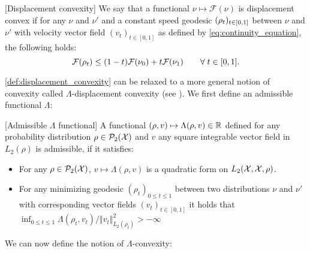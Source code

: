 \begin{definition}\label{def:displacement_convexity}[Displacement convexity] 
We say that a functional $\nu\mapsto\mathcal{F}(\nu)$ is displacement convex
	if for any $\nu$ and $\nu'$ and a constant speed geodesic $(\text{\ensuremath{\rho_{t}}})_{t \in [0,1]}$
	between $\nu$ and $\nu'$ with velocity vector field $(v_{t})_{t \in [0,1]}$ as defined by \cref{eq:continuity_equation},
	the following holds:
	\begin{equation}\label{eq:lambda_displacement_convex}
		{{\mathcal F}}(\rho_{t})\leq(1-t){{\mathcal F}}(\nu_{0})+t{{\mathcal F}}(\nu_{1}) \qquad\forall\; t\in[0,1].
	\end{equation}
\end{definition}
\cref{def:displacement_convexity} can be relaxed to a more general notion of convexity called $\Lambda$-displacement convexity (see \cite[Definition 16.5]{Villani:2009}). We first define an admissible functional $\Lambda$:
\begin{definition}\label{def:conditions_lambda}[Admissible $\Lambda$ functional]
	A functional $(\rho,v)\mapsto \Lambda(\rho,v) \in {{\mathbb R}}$  defined for any probability distribution $\rho\in \mathcal{P}_2({{\mathcal X}})$ and $v$ any square integrable vector field in $L_2(\rho)$ is admissible, if it satisfies:
	\begin{itemize}
	\item For any $\rho \in \mathcal{P}_2({{\mathcal X}})$,  $v\mapsto \Lambda(\rho,v)$ is a quadratic form on $L_2({{\mathcal X}},{{\mathcal X}},\rho)$.
	\item For any minimizing geodesic $(\rho_t)_{0\leq t\leq 1}$ between two distributions $\nu$ and $\nu'$ with corresponding vector fields $(v_t)_{t \in [0,1]}$ it holds that $\inf_{0\leq t\leq 1}\Lambda(\rho_t,v_t)/\Vert v_t\Vert_{L_{2}(\rho_t)}^{2}>-\infty$ 
\end{itemize}
\end{definition}
We can now define the notion of $\Lambda$-convexity:
